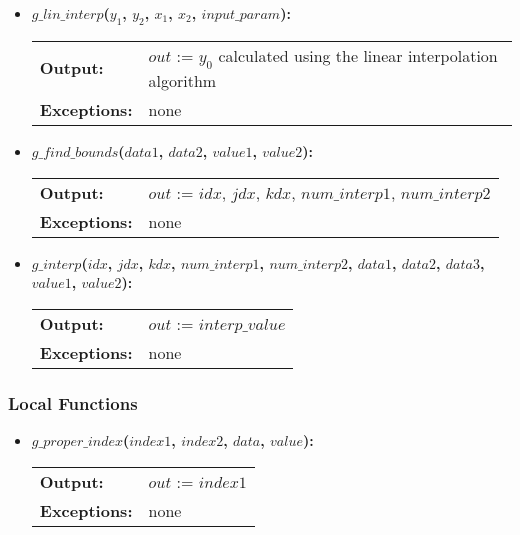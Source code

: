 \documentclass[12pt]{article}
\begin{document}
\begin{itemize}
\item\textbf{$g\_lin\_interp$($y_{1}$, $y_{2}$, $x_{1}$, $x_{2}$, $input\_param$):} \\ \newline
\begin{tabular}{l p{}}
\textbf{Output:} & $out$ := $y_{0}$ calculated using the linear interpolation algorithm \\ 
\textbf{Exceptions:} & none\\
\end{tabular}

\item\textbf{$g\_find\_bounds$($data1$, $data2$, $value1$, $value2$):} \\ \newline
\begin{tabular}{l p{}}
\textbf{Output:} & $out$ := $idx$, $jdx$, $kdx$, $num\_interp1$, $num\_interp2$\\ 
\textbf{Exceptions:} & none\\ 
\end{tabular}

\item\textbf{$g\_interp$($idx$, $jdx$, $kdx$, $num\_interp1$, $num\_interp2$, $data1$, $data2$, $data3$, $value1$, $value2$):} \\ \newline
\begin{tabular}{l p{}}
\textbf{Output:} & $out$ := $interp\_value$\\ 
\textbf{Exceptions:} & none\\ 
\end{tabular}
\end{itemize}

\subsubsection{Local Functions}

\begin{itemize}
\item\textbf{$g\_proper\_index$($index1$, $index2$, $data$, $value$):} \\ \newline
\begin{tabular}{l p{}} 
\textbf{Output:} & $out$ := $index1$\\
\textbf{Exceptions:} & none\\
\end{tabular}
\end{itemize}
\end{document}
